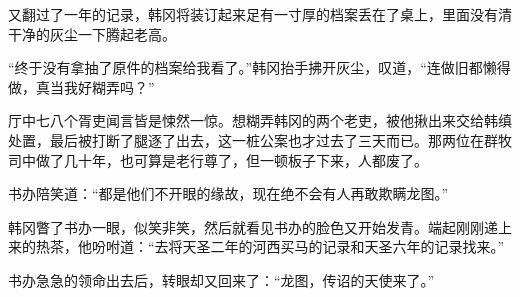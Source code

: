 又翻过了一年的记录，韩冈将装订起来足有一寸厚的档案丢在了桌上，里面没有清干净的灰尘一下腾起老高。

“终于没有拿抽了原件的档案给我看了。”韩冈抬手拂开灰尘，叹道，“连做旧都懒得做，真当我好糊弄吗？”

厅中七八个胥吏闻言皆是悚然一惊。想糊弄韩冈的两个老吏，被他揪出来交给韩缜处置，最后被打断了腿逐了出去，这一桩公案也才过去了三天而已。那两位在群牧司中做了几十年，也可算是老行尊了，但一顿板子下来，人都废了。

书办陪笑道：“都是他们不开眼的缘故，现在绝不会有人再敢欺瞒龙图。”

韩冈瞥了书办一眼，似笑非笑，然后就看见书办的脸色又开始发青。端起刚刚递上来的热茶，他吩咐道：“去将天圣二年的河西买马的记录和天圣六年的记录找来。”

书办急急的领命出去后，转眼却又回来了：“龙图，传诏的天使来了。”


